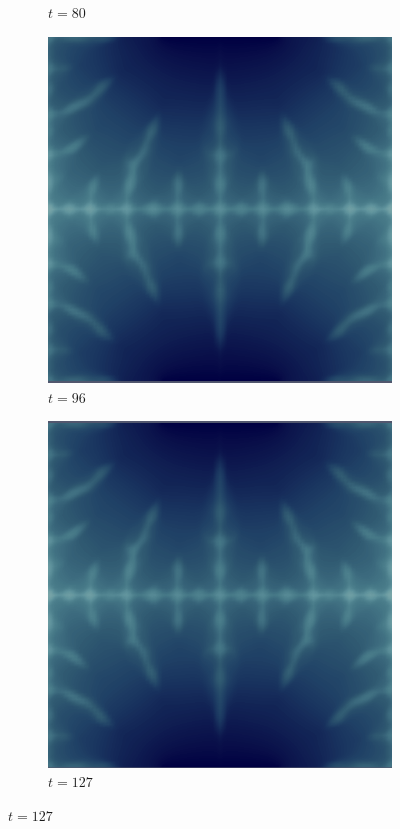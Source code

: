 \begin{figure}[H]
\begin{subfigure}{.4\textwidth}
        \caption{$t = 80$}
    \end{subfigure}
    \begin{subfigure}{.4\textwidth}
        \includegraphics[width=\textwidth]{imgs/UnitSquare2_State/seventh.png}
        \caption{$t = 96$}
    \end{subfigure}
    \begin{subfigure}{.4\textwidth}
        \includegraphics[width=\textwidth]{imgs/UnitSquare2_State/eighth.png}
        \caption{$t = 127$}
    \end{subfigure}
\end{figure}

